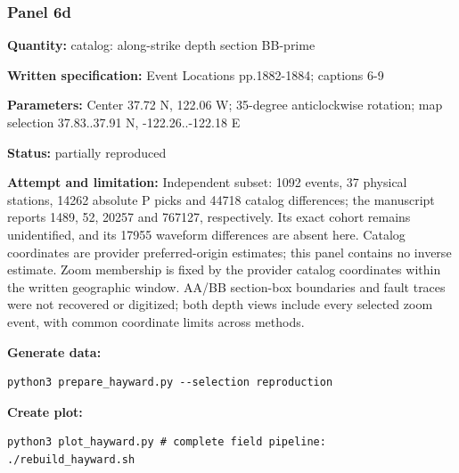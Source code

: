 \subsubsection*{Panel 6d}
\noindent\textbf{Quantity:} catalog: along-strike depth section BB-prime\par
\noindent\textbf{Written specification:} Event Locations pp.1882-1884; captions 6-9\par
\noindent\textbf{Parameters:} Center 37.72 N, 122.06 W; 35-degree anticlockwise rotation; map selection 37.83..37.91 N, -122.26..-122.18 E\par
\noindent\textbf{Status:} partially reproduced\par
\noindent\textbf{Attempt and limitation:} Independent subset: 1092 events, 37 physical stations, 14262 absolute P picks and 44718 catalog differences; the manuscript reports 1489, 52, 20257 and 767127, respectively. Its exact cohort remains unidentified, and its 17955 waveform differences are absent here. Catalog coordinates are provider preferred-origin estimates; this panel contains no inverse estimate. Zoom membership is fixed by the provider catalog coordinates within the written geographic window. AA/BB section-box boundaries and fault traces were not recovered or digitized; both depth views include every selected zoom event, with common coordinate limits across methods.\par
\noindent\textbf{Generate data:}
\begin{lstlisting}
python3 prepare_hayward.py --selection reproduction
\end{lstlisting}
\noindent\textbf{Create plot:}
\begin{lstlisting}
python3 plot_hayward.py # complete field pipeline: ./rebuild_hayward.sh
\end{lstlisting}
